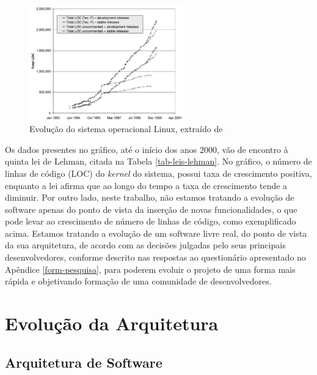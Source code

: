 \graphicspath{{figuras/}}
\begin{figure}[H]
\centering
\includegraphics[width=0.6\textwidth]{linux-evolution}
\caption{Evolução do sistema operacional Linux, extraído de \cite{godfrey2000evolution}}
\label{fig-evolucaolinux}
\end{figure}

Os dados presentes no gráfico, até o início dos anos 2000, vão de encontro à quinta lei de Lehman, citada na Tabela \ref{tab-leis-lehman}. No gráfico, o número de linhas de código (LOC) do \textit{kernel} do sistema, possui taxa de crescimento positiva, enquanto a lei afirma que ao longo do tempo a taxa de crescimento tende a diminuir.
%
Por outro lado, neste trabalho, não estamos tratando a evolução de software apenas do ponto de vista da inserção de novas funcionalidades, o que pode levar ao crescimento de número de linhas de código, como exemplificado acima. Estamos tratando a evolução de um software livre real, do ponto de vista da sua arquitetura, de acordo com as decisões julgadas pelo seus principais desenvolvedores, conforme descrito nas respostas ao questionário apresentado no Apêndice \ref{form-pesquisa}, para poderem evoluir o projeto de uma forma mais rápida e objetivando formação de uma comunidade de desenvolvedores.

\section{Evolução da Arquitetura}

\subsection{Arquitetura de Software}



